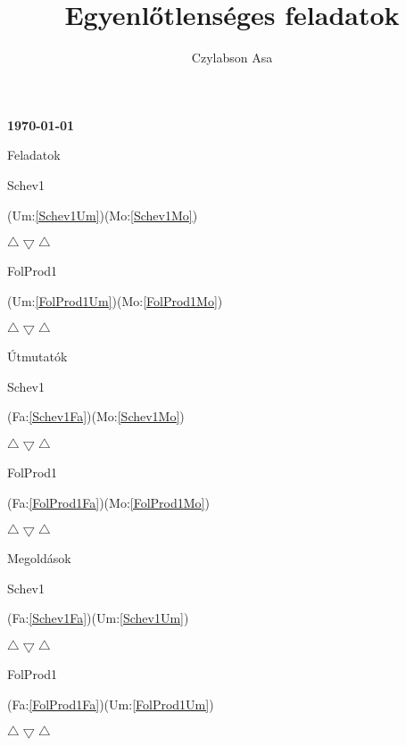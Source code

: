 \documentclass[12pt]{amsbook}
\newcommand{\Fa}[1]{%
\begin{subsubsection}{#1}%
   \label{#1Fa}
   \hspace{0.5cm}
   \par
   
   \hspace{0.5cm}
   \newline
   \par{(Um:\ref{#1Um})(Mo:\ref{#1Mo})}
   \newline
   \centerline{$\triangle\bigtriangledown\triangle$}
   \newline
\end{subsubsection}%
}%
\newcommand{\Um}[1]{%
\begin{subsubsection}{#1}%
   \label{#1Um}
   \hspace{0.5cm}
   \par
   
   \hspace{0.5cm}
   \newline
   \par{(Fa:\ref{#1Fa})(Mo:\ref{#1Mo})}
   \newline
   \centerline{$\triangle\bigtriangledown\triangle$}
   \newline
\end{subsubsection}%
}%
\newcommand{\Mo}[1]{%
\begin{subsubsection}{#1}%
   \label{#1Mo}
   \hspace{0.5cm}
   \par
   
   \hspace{0.5cm}
   \newline
   \par{(Fa:\ref{#1Fa})(Um:\ref{#1Um})}
   \newline
   \centerline{$\triangle\bigtriangledown\triangle$}
   \newline
\end{subsubsection}%
}%
\begin{document}
\begin{spacing}{1.3}



\author{Czylabson Asa}
\title{Egyenlőtlenséges feladatok}
\maketitle


\pagestyle{plain}
\begin{center}{\bf\today}\end{center}
\tableofcontents
\clearpage
\newpage




\hspace{2cm}

\begin{section}{Feladatok}
   \label{Fa}
   \Fa{Schev1}
	\Fa{FolProd1}
   \hspace{0.5cm}
\newpage
\end{section}

\hspace{2cm}

\begin{section}{Útmutatók}
   \label{Um}
   \Um{Schev1}
	\Um{FolProd1}
\newpage
\end{section}

\hspace{2cm}

\begin{section}{Megoldások}
   \label{Mo}
   \Mo{Schev1}
	\Mo{FolProd1}
   \newpage
\end{section}
\hspace{2cm}


\end{spacing}
\end{document}
